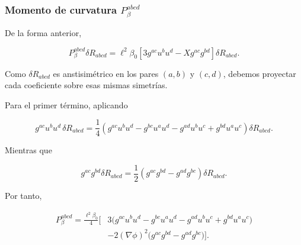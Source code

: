 \documentclass{beamer}
\newcommand{\CompactDisplaySpacing}{%
  \setlength{\abovedisplayskip}{2pt plus 1pt minus 1pt}%
  \setlength{\belowdisplayskip}{2pt plus 1pt minus 1pt}%
  \setlength{\abovedisplayshortskip}{0pt plus 1pt}%
  \setlength{\belowdisplayshortskip}{1pt plus 1pt}%
}
\begin{document}

\begin{frame}[label=nav-frame-100]
\frametitle{Momento de curvatura \(P_\beta^{abcd}\)}
\small
\linespread{.96}\selectfont\CompactDisplaySpacing
\CompactDisplaySpacing

De la forma anterior,

\[
P_\beta^{abcd}\delta R_{abcd}
=
\ell^2\beta_0
\left[
3g^{ac}u^bu^d
-
Xg^{ac}g^{bd}
\right]
\delta R_{abcd}.
\]


Como \(\delta R_{abcd}\) es anstisimétrico en los pares $(a, b)$ y $(c, d)$,
debemos proyectar cada coeficiente sobre esas mismas simetrías.

Para el primer término, aplicando

\[
g^{ac}u^bu^d\,\delta R_{abcd}
=
\frac14
\left(
g^{ac}u^bu^d
-g^{bc}u^au^d
-g^{ad}u^bu^c
+g^{bd}u^au^c
\right)
\delta R_{abcd}.
\]

Mientras que

\[
g^{ac}g^{bd}\delta R_{abcd}
=
\frac12
\left(
g^{ac}g^{bd}
-
g^{ad}g^{bc}
\right)\delta R_{abcd}.
\]


Por tanto,

\begin{equation}
\boxed{
\begin{aligned}
P_\beta^{abcd}
=
\frac{\ell^2\beta_0}{4}
\Big[
&3\big(
g^{ac}u^bu^d
-g^{bc}u^au^d
-g^{ad}u^bu^c
+g^{bd}u^au^c
\big)
\\
&-2(\nabla\phi)^2
\big(
g^{ac}g^{bd}
-
g^{ad}g^{bc}
\big)
\Big].
\end{aligned}
}
\label{eq:Pbeta-curvatura}
\end{equation}

\end{frame}
\end{document}

